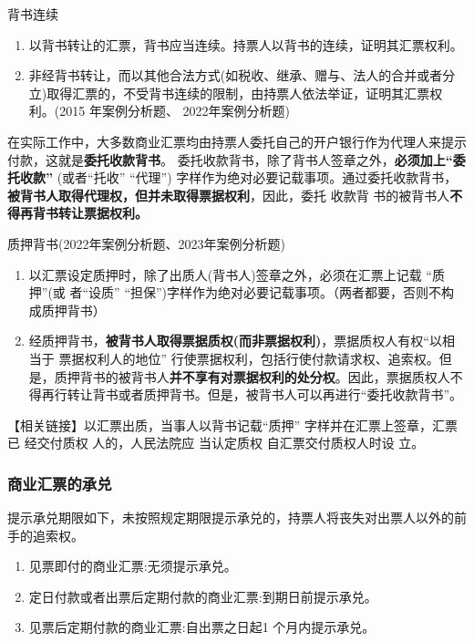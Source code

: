 \documentclass[UTF8,12pt]{ctexart}
\numberwithin{equation}{section} %
\numberwithin{figure}{section}
\numberwithin{table}{section}
\begin{document}
	背书连续
	\begin{enumerate}
		\item 以背书转让的汇票，背书应当连续。持票人以背书的连续，证明其汇票权利。 
		
		\item 非经背书转让，而以其他合法方式(如税收、继承、赠与、法人的合并或者分立)取得汇票的，不受背书连续的限制，由持票人依法举证，证明其汇票权利。(2015 年案例分析题、 2022年案例分析题)
	\end{enumerate}
	
	在实际工作中，大多数商业汇票均由持票人委托自己的开户银行作为代理人来提示付款，这就是\textbf{委托收款背书}。 委托收款背书，除了背书人签章之外，\textbf{必须加上“委托收款” }(或者“托收” “代理”) 字样作为绝对必要记载事项。通过委托收款背书，\textbf{被背书人取得代理权，但并未取得票据权利}，因此，委托 收款背 书的被背书人\textbf{不得再背书转让票据权利。}
	
	质押背书(2022年案例分析题、2023年案例分析题) 
	\begin{enumerate}
		\item 以汇票设定质押时，除了出质人(背书人)签章之外，必须在汇票上记载 “质押”(或 者“设质” “担保”)字样作为绝对必要记载事项。（两者都要，否则不构成质押背书）
		
		\item 经质押背书，\textbf{被背书人取得票据质权(而非票据权利)}，票据质权人有权“以相当于 票据权利人的地位” 行使票据权利，包括行使付款请求权、追索权。但是，质押背书的被背书人\textbf{并不享有对票据权利的处分权}。因此，票据质权人不得再行转让背书或者质押背书。但是，被背书人可以再进行“委托收款背书”。 
	\end{enumerate}
	【相关链接】以汇票出质，当事人以背书记载“质押” 字样并在汇票上签章，汇票已 经交付质权 人的，人民法院应 当认定质权 自汇票交付质权人时设 立。
	
	\subsubsection{商业汇票的承兑} 
	提示承兑期限如下，未按照规定期限提示承兑的，持票人将丧失对出票人以外的前手的追索权。
	\begin{enumerate}
		\item 见票即付的商业汇票:无须提示承兑。
		
		\item 定日付款或者出票后定期付款的商业汇票:到期日前提示承兑。
		
		\item 见票后定期付款的商业汇票:自出票之日起1 个月内提示承兑。
	\end{enumerate}
\end{document}
